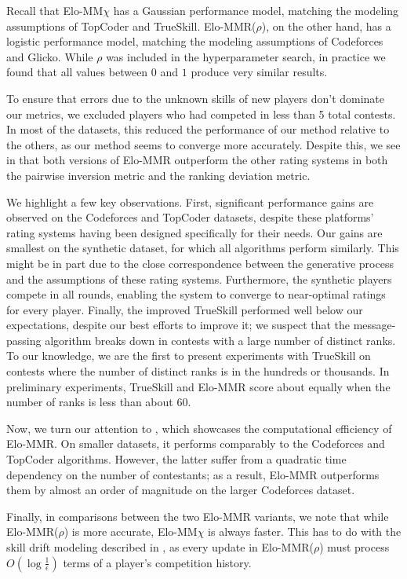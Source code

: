 Recall that Elo-MM$\chi$ has a Gaussian performance model, matching the modeling assumptions of TopCoder and TrueSkill. Elo-MMR($\rho$), on the other hand, has a logistic performance model, matching the modeling assumptions of Codeforces and Glicko. While $\rho$ was included in the hyperparameter search, in practice we found that all values between $0$ and $1$ produce very similar results.

To ensure that errors due to the unknown skills of new players don't dominate our metrics, we excluded players who had competed in less than 5 total contests. In most of the datasets, this reduced the performance of our method relative to the others, as our method seems to converge more accurately. Despite this, we see in  that both versions of Elo-MMR outperform the other rating systems in both the pairwise inversion metric and the ranking deviation metric.

We highlight a few key observations. First, significant performance gains are observed on the Codeforces and TopCoder datasets, despite these platforms' rating systems having been designed specifically for their needs. Our gains are smallest on the synthetic dataset, for which all algorithms perform similarly. This might be in part due to the close correspondence between the generative process and the assumptions of these rating systems. Furthermore, the synthetic players compete in all rounds, enabling the system to converge to near-optimal ratings for every player. Finally, the improved TrueSkill performed well below our expectations, despite our best efforts to improve it; we suspect that the message-passing algorithm breaks down in contests with a large number of distinct ranks. To our knowledge, we are the first to present experiments with TrueSkill on contests where the number of distinct ranks is in the hundreds or thousands. In preliminary experiments, TrueSkill and Elo-MMR score about equally when the number of ranks is less than about 60.

Now, we turn our attention to , which showcases the computational efficiency of Elo-MMR. On smaller datasets, it performs comparably to the Codeforces and TopCoder algorithms. However, the latter suffer from a quadratic time dependency on the number of contestants; as a result, Elo-MMR outperforms them by almost an order of magnitude on the larger Codeforces dataset.

Finally, in comparisons between the two Elo-MMR variants, we note that while Elo-MMR($\rho$) is more accurate, Elo-MM$\chi$ is always faster. This has to do with the skill drift modeling described in , as every update in Elo-MMR($\rho$) must process $O(\log\frac 1\epsilon)$ terms of a player's competition history.